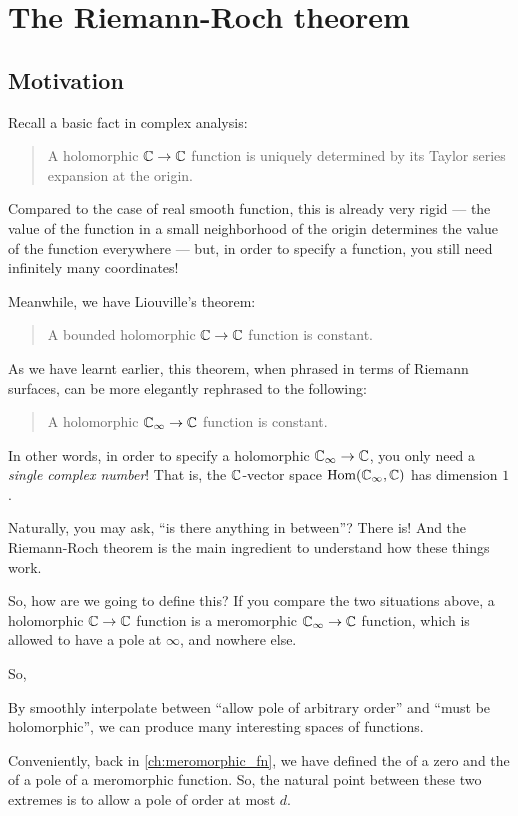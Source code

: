 \chapter{The Riemann-Roch theorem}
\label{ch:riemann_roch}

\section{Motivation}

Recall a basic fact in complex analysis:
\begin{quote}
	A holomorphic $\mathbb C \to \mathbb C$ function is uniquely determined by its Taylor series expansion at
	the origin.
\end{quote}

Compared to the case of real smooth function, this is already very rigid --- the value of the
function in a small neighborhood of the origin determines the value of the function everywhere ---
but, in order to specify a function, you still need infinitely many coordinates!

Meanwhile, we have Liouville's theorem:
\begin{quote}
	A bounded holomorphic $\mathbb C \to \mathbb C$ function is constant.
\end{quote}
As we have learnt earlier, this theorem, when phrased in terms of Riemann surfaces, can be more
elegantly rephrased to the following:
\begin{quote}
	A holomorphic $\mathbb C_\infty \to \mathbb C$ function is constant.
\end{quote}
In other words, in order to specify a holomorphic $\mathbb C_\infty \to \mathbb C$, you only need a \emph{single
complex number}! That is, the $\mathbb C$-vector space $\operatorname{Hom}(\mathbb C_\infty, \mathbb C)$ has dimension $1$.

Naturally, you may ask, ``is there anything in between''? There is! And the Riemann-Roch theorem is
the main ingredient to understand how these things work.

So, how are we going to define this? If you compare the two situations above,
a holomorphic $\mathbb C \to \mathbb C$ function is a meromorphic $\mathbb C_\infty \to \mathbb C$ function, which
is allowed to have a pole at $\infty$, and nowhere else.

So,
\begin{moral}
	By smoothly interpolate between ``allow pole of arbitrary order'' and ``must be holomorphic'',
	we can produce many interesting spaces of functions.
\end{moral}

Conveniently, back in \cref{ch:meromorphic_fn}, we have defined the  of a
zero and the  of a pole of a meromorphic function.
So, the natural point between these two extremes is to allow a pole of order at most $d$.

